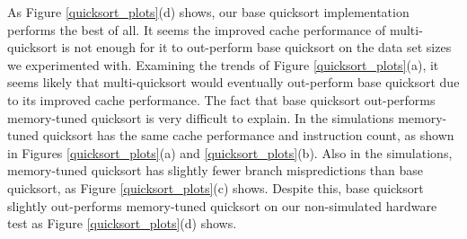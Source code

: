 \documentclass[acmtocl]{acmtrans2m}
\begin{document}
As Figure \ref{quicksort_plots}(d) shows, our base quicksort implementation
performs the best of all. It seems the improved cache performance of
multi-quicksort is not enough for it to out-perform base quicksort on the data
set sizes we experimented with. Examining the trends of Figure
\ref{quicksort_plots}(a), it seems likely that multi-quicksort would eventually
out-perform base quicksort due to its improved cache performance.  The fact that
base quicksort out-performs memory-tuned quicksort is very difficult to explain.
In the simulations memory-tuned quicksort has the same cache performance and
instruction count, as shown in Figures \ref{quicksort_plots}(a) and
\ref{quicksort_plots}(b). Also in the simulations, memory-tuned quicksort has
slightly fewer branch mispredictions than base quicksort, as Figure
\ref{quicksort_plots}(c) shows. Despite this, base quicksort slightly
out-performs memory-tuned quicksort on our non-simulated hardware test as Figure
\ref{quicksort_plots}(d) shows.
\end{document}

